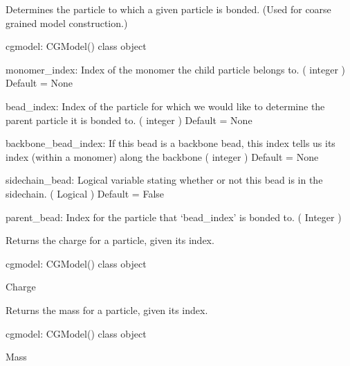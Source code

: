 \documentclass[letterpaper,12pt,english,openany,oneside]{sphinxmanual}
\begin{document}
\begin{fulllineitems}
\label{\detokenize{cg_model:cg_model.cgmodel.get_parent_bead}}
Determines the particle to which a given particle is bonded.  (Used for coarse grained model construction.)

cgmodel: CGModel() class object

monomer\_index: Index of the monomer the child particle belongs to.
( integer )
Default = None

bead\_index: Index of the particle for which we would like to determine the parent particle it is bonded to.
( integer )
Default = None

backbone\_bead\_index: If this bead is a backbone bead, this index tells us its index (within a monomer) along the backbone
( integer )
Default = None

sidechain\_bead: Logical variable stating whether or not this bead is in the sidechain.
( Logical )
Default = False

parent\_bead: Index for the particle that ‘bead\_index’ is bonded to.
( Integer )

\end{fulllineitems}


\begin{fulllineitems}
\label{\detokenize{cg_model:cg_model.cgmodel.get_particle_charge}}
Returns the charge for a particle, given its index.

cgmodel: CGModel() class object

Charge

\end{fulllineitems}


\begin{fulllineitems}
\label{\detokenize{cg_model:cg_model.cgmodel.get_particle_mass}}
Returns the mass for a particle, given its index.

cgmodel: CGModel() class object

Mass

\end{fulllineitems}
\end{document}
